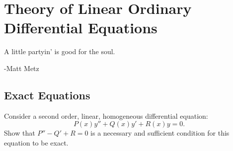 \flushbottom







\chapter{Theory of Linear Ordinary Differential Equations}
\label{chapter_tolo}


A little partyin' is good for the soul.

\begin{flushright}
  -Matt Metz
\end{flushright}









\section{Exact Equations}










\begin{Exercise}
  \label{exercise second order exact}
  Consider a second order, linear, homogeneous differential equation:
  \begin{equation}
    \label{equation Py''+Qy'+Ry=0}
    P(x) y'' + Q(x) y' + R(x) y = 0.
  \end{equation}
  Show that $P'' - Q' + R = 0$ is a necessary and sufficient condition 
  for this equation to be exact.

\end{Exercise}



